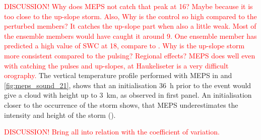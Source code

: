 %
\textcolor{red}{DISCUSSION! Why does MEPS not catch that peak at \SI{16}{\UTC}? Maybe because it is too close to the up-slope storm. Also, Why is the control so high compared to the perturbed members? It catches the up-slope part when also a little weak. Most of the ensemble members would have caught it around \SI{9}{\UTC}. One ensemble member has predicted a high value of SWC at \SI{18}{\UTC}, compare to . Why is the up-slope storm more consistent compared to the pulsing? Regional effects? MEPS does well even with catching the pulses and up-slopes, at Haukeliseter is a very difficult orography. }
\newline \noindent
The vertical temperature profile performed with MEPS in  and \ref{fig:meps_sound_21}, shows that an initialisation \SI{36}{\hour} prior to the event would give a cloud with height up to \SI{3}{\km}, as observed in  first panel. An initialisation closer to the occurrence of the storm shows, that MEPS underestimates the intensity and height of the storm ().
%

\textcolor{red}{DISCUSSION! Bring all into relation with the coefficient of variation.}



